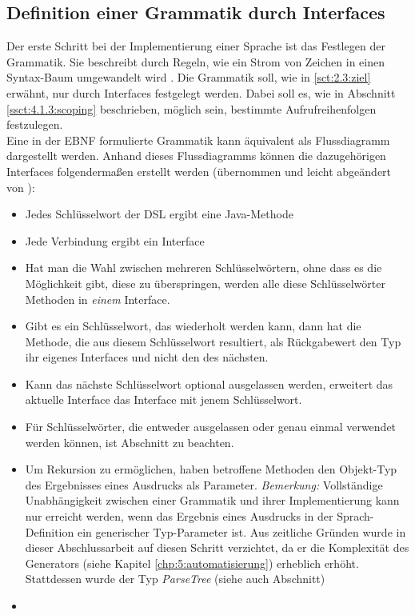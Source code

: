 \subsection{Definition einer Grammatik durch Interfaces}\label{ssct:4.3.1:grammatik}
Der erste Schritt bei der Implementierung einer Sprache ist das Festlegen der Grammatik. Sie beschreibt durch Regeln, wie ein Strom von Zeichen in einen Syntax-Baum umgewandelt wird \cite{book:fowlerDSL}. Die Grammatik soll, wie in \ref{sct:2.3:ziel} erwähnt, nur durch Interfaces festgelegt werden. Dabei soll es, wie in Abschnitt \ref{ssct:4.1.3:scoping} beschrieben, möglich sein, bestimmte Aufrufreihenfolgen festzulegen.\\ Eine in der EBNF formulierte Grammatik kann äquivalent als Flussdiagramm dargestellt werden. Anhand dieses Flussdiagramms können die dazugehörigen Interfaces folgendermaßen erstellt werden (übernommen und leicht abgeändert von \cite{www:jooq:fluentAPI}):

\begin{itemize}
	\item Jedes Schlüsselwort der DSL ergibt eine Java-Methode
	\item Jede Verbindung ergibt ein Interface
	\item Hat man die Wahl zwischen mehreren Schlüsselwörtern, ohne dass es die Möglichkeit gibt, diese zu überspringen, werden alle diese Schlüsselwörter Methoden in \emph{einem} Interface.
	\item Gibt es ein Schlüsselwort, das wiederholt werden kann, dann hat die Methode, die aus diesem Schlüsselwort resultiert, als Rückgabewert den Typ ihr eigenes Interfaces und nicht den des nächsten.
	\item Kann das nächste Schlüsselwort optional ausgelassen werden, erweitert das aktuelle Interface das Interface mit jenem Schlüsselwort.
	\item Für Schlüsselwörter, die entweder ausgelassen oder genau einmal verwendet werden können, ist Abschnitt  zu beachten.
	\item Um Rekursion zu ermöglichen, haben betroffene Methoden den Objekt-Typ des Ergebnisses eines Ausdrucks als Parameter. \emph{Bemerkung:} Vollständige Unabhängigkeit zwischen einer Grammatik und ihrer Implementierung kann nur erreicht werden, wenn das Ergebnis eines Ausdrucks in der Sprach-Definition ein generischer Typ-Parameter ist. Aus zeitliche Gründen wurde in dieser Abschlussarbeit auf diesen Schritt verzichtet, da er die Komplexität des Generators (siehe Kapitel \ref{chp:5:automatisierung}) erheblich erhöht. Stattdessen wurde der Typ \emph{ParseTree} (siehe auch Abschnitt)
	\item {}
\end{itemize}

